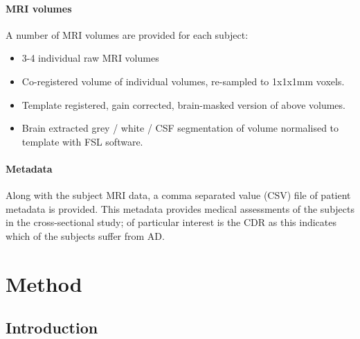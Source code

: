 \documentclass[
    author={Kai Hulme},
    supervisor={Dr Jon Bird},
    degree={BSc},
    title={Generative Adversarial Networks as an Augmentation Technique},
    subtitle={for Alzheimer's Disease Detection in MRI Volumes},
    type={Research},
    year={2021} 
]{dissertation}
\begin{document}
\subsubsection{MRI volumes}

A number of MRI volumes are provided for each subject:

\begin{itemize}
    \item 3-4 individual raw MRI volumes
    \item Co-registered volume of individual volumes, re-sampled to 1x1x1mm voxels.
    \item Template registered, gain corrected, brain-masked version of above volumes.
    \item Brain extracted grey / white / CSF segmentation of volume normalised to template with FSL software. 
\end{itemize}

\subsubsection{Metadata}

Along with the subject MRI data, a comma separated value (CSV) file of patient metadata is provided. This metadata provides medical assessments of the subjects in the cross-sectional study; of particular interest is the CDR as this indicates which of the subjects suffer from AD.






\chapter{Method}
\label{chap:method}


\section{Introduction}
\end{document}
